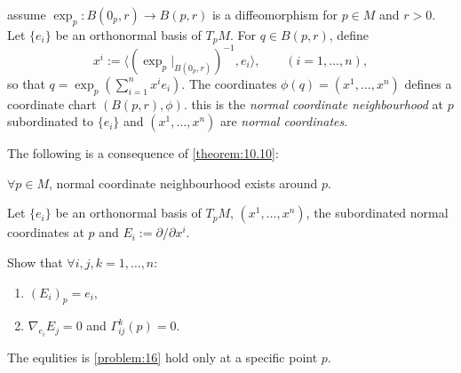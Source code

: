 \begin{definition}
assume $\exp_p:B(0_p,r) \to B(p,r)$ is a diffeomorphism for $p \in M$ and $r >0$. Let $\{e_i\}$ be an 
orthonormal basis of $T_pM$. For $q \in B(p,r)$, define
\[
x^i := \langle (\exp_p|_{B(0_p,r)})^{-1},e_i\rangle, \qquad (i=1,\dots,n),
\]
so that $q = \exp_p\left(\sum_{i=1}^n x^i e_i\right)$. The coordinates $\phi(q) = (x^1,\dots,x^n)$ defines a coordinate chart $(B(p,r),\phi)$.
this is the \emph{normal coordinate neighbourhood} at $p$ subordinated to $\{e_i\}$ and $(x^1,\dots,x^n)$ are \emph{normal coordinates}.
\end{definition}

The following is a consequence of \autoref{theorem:10.10}:

\begin{corollary}
$\forall p \in M$, normal coordinate neighbourhood exists around $p$.
\end{corollary}

Let $\{e_i\}$ be an orthonormal basis of $T_pM$, $(x^1,\dots,x^n)$, the subordinated normal coordinates at $p$ and $E_i := \partial/\partial x^i$.
\begin{problem}\label{problem:16}
Show that $\forall i,j,k = 1,\dots,n$:
\begin{enumerate}[label=(\arabic*)]
\item $(E_i)_p = e_i$,
\item $\nabla_{e_i}E_j = 0$ and $\Gamma_{ij}^k(p) = 0$.
\end{enumerate}
\end{problem}

\begin{remark}
The equlities is \autoref{problem:16} hold only at a specific point $p$.
\end{remark}